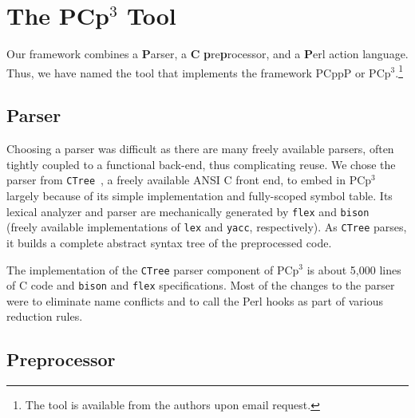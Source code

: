 \documentclass{article}
\newcommand{\pcp}{\mbox{\textsf{PCp}$^3$}}
\newcommand{\pcppp}{\mbox{\textsf{PCppP}}}
\newcommand{\Cpp}{\mbox{\textsf{cpp}}}
\newcommand{\Perl}{\mbox{Perl}}
\newcommand{\C}{\mbox{C}}
\begin{document}
\section{The \pcp{} Tool}
\label{sec:pcp3}

Our framework combines a
\textbf{\textsf{P}}arser, a \textbf{\textsf{C}}
\textbf{\textsf{p}}re\textbf{\textsf{p}}rocessor, and a
\textbf{\textsf{P}}erl action language.  Thus, we have named the tool
that implements the framework \pcppp{} or \pcp{}.\footnote{The tool is
  available from the authors upon email request.}

\subsection{Parser}
\label{ssec:parser}

Choosing a parser was difficult as there are many freely available
parsers, often tightly coupled to a functional back-end, thus
complicating reuse.  We chose the parser from \texttt{CTree}~\cite{CTree}, a
freely available ANSI \C{} front end, to embed in \pcp{}
largely because of its simple implementation and fully-scoped symbol
table.  Its lexical analyzer and parser are mechanically generated
by \texttt{flex} and \texttt{bison}~\cite{BisonAndFlex,Levine92} (freely
available implementations of \texttt{lex} and \texttt{yacc},
respectively).  As \texttt{CTree} parses, it builds a complete abstract
syntax tree of the preprocessed code.

The implementation of the \texttt{CTree} parser component of \pcp{} is
about 5,000 lines of \C{} code and \texttt{bison} and \texttt{flex}
specifications.  Most of the changes to the parser were to eliminate
name conflicts and to call the \Perl{} hooks as part of various
reduction rules.


\subsection{Preprocessor}
\label{ssec:preprocessor}

\end{document}
